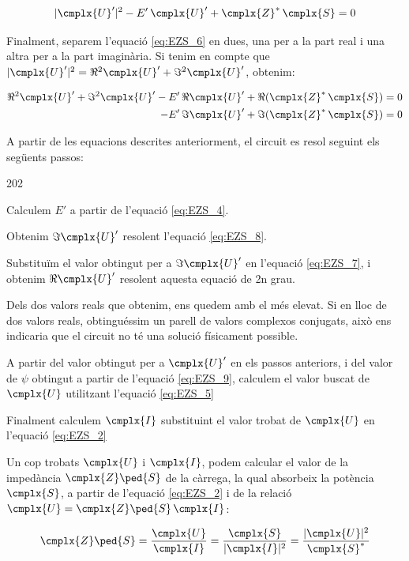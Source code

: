 \begin{equation}
   |\cmplx{U}'|^2 - E' \, \cmplx{U}' + \cmplx{Z}^* \, \cmplx{S} = 0 \label{eq:EZS_6}
\end{equation}

Finalment, separem l'equació \eqref{eq:EZS_6} en dues, una per a la part real i una altra per a la part imaginària.
Si tenim en compte que $|\cmplx{U}'|^2 = \Re^2\cmplx{U}' + \Im^2\cmplx{U}'$, obtenim:

\begin{align}
   \Re^2\cmplx{U}' + \Im^2\cmplx{U}' - E' \, \Re\cmplx{U}' + \Re(\cmplx{Z}^* \, \cmplx{S}) &= 0 \label{eq:EZS_7} \\
   - E' \, \Im\cmplx{U}' + \Im(\cmplx{Z}^* \, \cmplx{S}) &= 0 \label{eq:EZS_8}
\end{align}

A partir de les equacions descrites anteriorment, el circuit es resol seguint els següents passos:
\begin{dingautolist}{202}
   \item Calculem $E'$ a partir de l'equació \eqref{eq:EZS_4}.
   \item Obtenim $\Im\cmplx{U}'$ resolent l'equació \eqref{eq:EZS_8}.
   \item Substituïm el valor obtingut per a $\Im\cmplx{U}'$ en l'equació \eqref{eq:EZS_7}, i obtenim $\Re\cmplx{U}'$ resolent aquesta equació de 2n grau.
   \item Dels dos valors reals que obtenim, ens quedem amb el més elevat. Si en lloc de dos valors reals, obtinguéssim un parell de valors  complexos conjugats, això ens indicaria que el circuit no té una solució físicament possible.
   \item A partir del valor  obtingut per a $\cmplx{U}'$ en els passos anteriors, i del valor de $\psi$ obtingut a partir de l'equació \eqref{eq:EZS_9}, calculem el valor buscat de $\cmplx{U}$ utilitzant l'equació \eqref{eq:EZS_5}
   \item Finalment calculem $\cmplx{I}$ substituint el valor trobat de $\cmplx{U}$ en l'equació \eqref{eq:EZS_2}
\end{dingautolist}

Un cop trobats $\cmplx{U}$ i $\cmplx{I}$, podem calcular el valor de
la impedància  $\cmplx{Z}\ped{S}$ de la càrrega, la qual absorbeix
la potència $\cmplx{S}$, a partir de l'equació \eqref{eq:EZS_2} i de
la relació $\cmplx{U} = \cmplx{Z}\ped{S} \,\cmplx{I}$:

\begin{equation}
   \cmplx{Z}\ped{S} = \frac{\cmplx{U}}{\cmplx{I}} =
   \frac{\cmplx{S}}{|\cmplx{I}|^2} =
   \frac{|\cmplx{U}|^2}{\cmplx{S}^*} \label{eq:EZS 10}
\end{equation}


